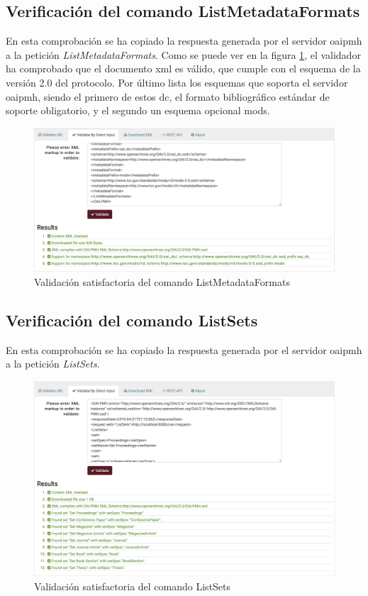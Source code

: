 \subsection{Verificación del comando ListMetadataFormats}

En esta comprobación se ha copiado la respuesta generada por el servidor \acrshort{oaipmh} a la petición \textit{ListMetadataFormats}. Como se puede ver en la figura \ref{fig:listmetadataformats}, el validador ha comprobado que el documento \acrshort{xml} es válido, que cumple con el esquema de la versión 2.0 del protocolo. Por último lista los esquemas que soporta el servidor \acrshort{oaipmh}, siendo el primero de estos \acrlong{dc}, el formato bibliográfico estándar de soporte obligatorio, y el segundo un esquema opcional \acrfull{mods}\cite{MODS}.

\begin{figure}[!htbp]
	\centering
	\includegraphics[scale=0.31]{fig/oaipmh_validations/ListMetadataFormats}
	\caption{Validación satisfactoria del comando ListMetadataFormats}
	\label{fig:listmetadataformats}
\end{figure}

\subsection{Verificación del comando ListSets}

En esta comprobación se ha copiado la respuesta generada por el servidor \acrshort{oaipmh} a la petición \textit{ListSets}. 

\begin{figure}[!htbp]
	\centering
	\includegraphics[scale=0.31]{fig/oaipmh_validations/ListSets}
	\caption{Validación satisfactoria del comando ListSets}
	\label{fig:listsets}
\end{figure}

